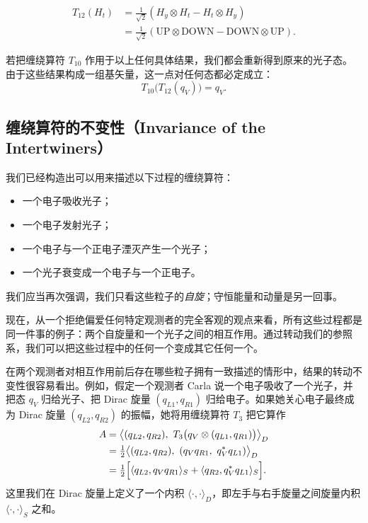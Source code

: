 \begin{align*}
T_{12}(H_t)
&= \frac{1}{\sqrt2}(H_y\otimes H_t-H_t\otimes H_y)\\
&= \frac{1}{\sqrt2}(\text{UP}\otimes\text{DOWN}-\text{DOWN}\otimes\text{UP}).
\end{align*}

若把缠绕算符 $T_{10}$ 作用于以上任何具体结果，我们都会重新得到原来的光子态。由于这些结果构成一组基矢量，这一点对任何态都必定成立：
\begin{equation*}
T_{10}\bigl(T_{12}(q_V)\bigr)=q_V .
\end{equation*}

\subsection{缠绕算符的不变性（Invariance of the Intertwiners）}


我们已经构造出可以用来描述以下过程的缠绕算符：
\begin{itemize}
  \item 一个电子吸收光子；
  \item 一个电子发射光子；
  \item 一个电子与一个正电子湮灭产生一个光子；
  \item 一个光子衰变成一个电子与一个正电子。
\end{itemize}
我们应当再次强调，我们只看这些粒子的\emph{自旋}；守恒能量和动量是另一回事。

现在，从一个拒绝偏爱任何特定观测者的完全客观的观点来看，所有这些过程都是同一件事的例子：两个自旋量和一个光子之间的相互作用。通过转动我们的参照系，我们可以把这些过程中的任何一个变成其它任何一个。

在两个观测者对相互作用前后存在哪些粒子拥有一致描述的情形中，结果的转动不变性很容易看出。例如，假定一个观测者 Carla 说一个电子吸收了一个光子，并把态 $q_V$ 归给光子、把 Dirac 旋量 $(q_{L1},q_{R1})$ 归给电子。如果她关心电子最终成为 Dirac 旋量 $(q_{L2},q_{R2})$ 的振幅，她将用缠绕算符 $T_3$ 把它算作
\begin{align*}
A &= \bigl\langle (q_{L2},q_{R2}),\ T_3\bigl(q_V\otimes(q_{L1},q_{R1})\bigr)\bigr\rangle_D\\
&= \tfrac12\bigl\langle (q_{L2},q_{R2}),\ (q_V q_{R1},\ q_V^* q_{L1})\bigr\rangle_D\\
&= \tfrac12\Bigl[\langle q_{L2},q_V q_{R1}\rangle_S+\langle q_{R2},q_V^* q_{L1}\rangle_S\Bigr].
\end{align*}
这里我们在 Dirac 旋量上定义了一个内积 $\langle\cdot,\cdot\rangle_D$，即左手与右手旋量之间旋量内积 $\langle\cdot,\cdot\rangle_S$ 之和。

